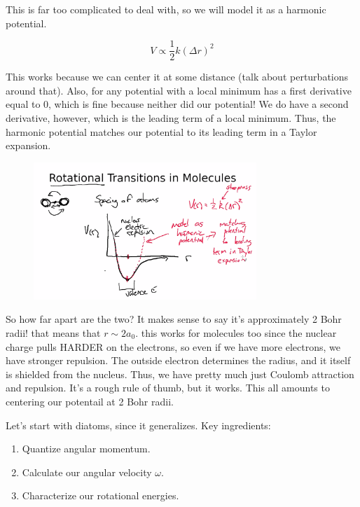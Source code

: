 \documentclass{article}
\newcommand{\be}{\begin{equation}}
\newcommand{\ee}{\end{equation}}
\begin{document}
This is far too complicated to deal with, so we will model it as a harmonic potential. 

\be
V \propto \frac12 k \left(\Delta r\right)^2
\ee


This works because we can center it at some distance (talk about perturbations around that). Also, for any potential with a local minimum has a first derivative equal to 0, which is fine because neither did our potential! We do have a second derivative, however, which is the leading term of a local minimum. Thus, the harmonic potential matches our potential to its leading term in a Taylor expansion. 

\begin{figure}
    \centering
\includegraphics[width=0.75\textwidth]{Screen Shot 2020-09-29 at 11.32.41 AM.png}
    \caption{}
    \label{fig:pot2}
\end{figure}

So how far apart are the two? It makes sense to say it's approximately 2 Bohr radii! that means that $r \sim 2 a_0$. this works for molecules too since the nuclear charge pulls HARDER on the electrons, so even if we have more electrons, we have stronger repulsion. The outside electron determines the radius, and it itself is shielded from the nucleus. Thus, we have pretty much just Coulomb attraction and repulsion. It's a rough rule of thumb, but it works. This all amounts to centering our potentail at 2 Bohr radii.

Let's start with diatoms, since it generalizes. Key ingredients:

\begin{enumerate}
    \item Quantize angular momentum.
    \item Calculate our angular velocity $\omega$. 
    \item Characterize our rotational energies. 
\end{enumerate}
\end{document}
